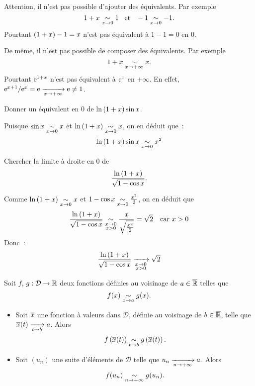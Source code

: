 \documentclass{magnoliaold}
\begin{document}
\begin{remarques}
\item Attention, il n'est pas possible d'ajouter des équivalents. Par exemple
  \[1+x\underset{x\rightarrow 0}{\sim}1 \quad\!\text{et}\quad\! -1\underset{x\rightarrow 0}{\sim}-1.\]
  Pourtant $\left(1+x\right)-1=x$ n'est pas équivalent à $1-1=0$ en 0.
\item De même, il n'est pas possible de composer des équivalents. Par exemple
  \[1+x\underset{x\rightarrow +\infty}{\sim}x.\]
  Pourtant ${\rm e}^{1+x}$ n'est pas équivalent à ${\rm e}^x$ en $+\infty$. En effet,
  ${\rm e}^{x+1}/{\rm e}^x={\rm e}\xrightarrow[x\rightarrow +\infty]{} {\rm e}\neq 1$.
\end{remarques}

\begin{exos}
\item Donner un équivalent en 0 de $\ln\left(1+x\right)\sin x$.
\begin{sol} Puisque $\sin x\underset{x\rightarrow 0}{\sim}x$ et $\ln\left(1+x\right)\underset{x\rightarrow 0}{\sim}x$, on en déduit
   que~:
   \[\ln\left(1+x\right)\sin x\underset{x\rightarrow 0}{\sim}x^2\]
   \end{sol}
\item Chercher la limite à droite en 0 de
  \[\frac{\ln\left(1+x\right)}{\sqrt{1-\cos x}}.\]
  \begin{sol}
   Comme $\ln\left(1+x\right)\underset{x\rightarrow 0}{\sim}x$ et $1-\cos x\underset{x\rightarrow 0}{\sim}
     \frac{x^2}{2}$, on en déduit que
   \[\frac{\ln\left(1+x\right)}{\sqrt{1-\cos x}}\underset{\substack{x\rightarrow 0\\x>0}}{\sim}\frac{x}{\sqrt{\frac{x^2}{2}}}=
     \sqrt{2} \quad \text{car $x>0$}\]
   Donc~:
   \[\frac{\ln\left(1+x\right)}{\sqrt{1-\cos x}}\xrightarrow[ \substack{x\rightarrow 0 \\ x>0}]{} \sqrt{2}\]
   \end{sol}
\end{exos}

\begin{proposition}[utile=-3]
Soit $f$, $g:\mathcal{D}\to\mathbb{R}$ deux fonctions définies au voisinage de
$a\in\overline{\mathbb{R}}$ telles que
\[f(x)\underset{x\rightarrow a}{\sim}g(x).\]
\begin{itemize}
\item Soit $\overline{x}$ une fonction à valeurs dans $\mathcal{D}$,
  définie au voisinage de $b\in\overline{\mathbb{R}}$, telle que
  $\overline{x}(t)\xrightarrow[t\rightarrow b]{}a$. Alors
  \[f\left(\overline{x}(t)\right)\underset{t\rightarrow b}{\sim}g\left(\overline{x}(t)\right).\]
\item Soit $(u_n)$ une suite d'éléments de $\mathcal{D}$
  telle que $u_n\xrightarrow[n\rightarrow +\infty]{} a$. Alors
  \[f(u_n)\underset{n\rightarrow +\infty}{\sim}g(u_n).\]
\end{itemize}
\end{proposition}
\end{document}
